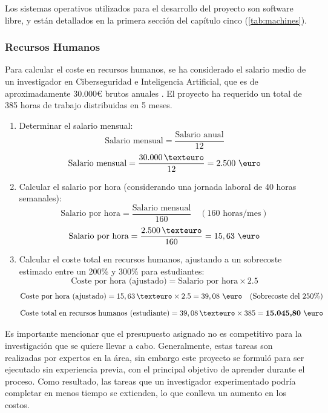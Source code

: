 Los sistemas operativos utilizados para el desarrollo del proyecto son software libre, y están detallados en la primera sección del capítulo cinco (\ref{tab:machines}).

\subsubsection*{Recursos Humanos}

Para calcular el coste en recursos humanos, se ha considerado el salario medio de un investigador en Ciberseguridad e Inteligencia Artificial, que es de aproximadamente 30.000€ brutos anuales \cite{ufv2023cybersecurity}. El proyecto ha requerido un total de 385 horas de trabajo distribuidas en 5 meses.

\begin{enumerate}
    \item Determinar el salario mensual:
    \[
    \text{Salario mensual} = \frac{\text{Salario anual}}{12}
    \]
    \[
    \text{Salario mensual} = \frac{30.000\,€}{12} = 2.500 \ \text{\euro}
    \]

    \item Calcular el salario por hora (considerando una jornada laboral de 40 horas semanales):
    \[
    \text{Salario por hora} = \frac{\text{Salario mensual}}{160} \quad (\text{160 horas/mes})
    \]
    \[
    \text{Salario por hora} = \frac{2.500\,€}{160} = 15,63 \ \text{\euro}
    \]

    \item Calcular el coste total en recursos humanos, ajustando a un sobrecoste estimado entre un 200\% y 300\% para estudiantes:
    \[
    \text{Coste por hora (ajustado)} = \text{Salario por hora} \times 2.5
    \]
    \[
    \text{Coste por hora (ajustado)} = 15,63\,€ \times 2.5 = 39,08 \ \text{\euro} \quad (\text{Sobrecoste del 250\%})
    \]
    \[
    \text{Coste total en recursos humanos (estudiante)} = 39,08\,€ \times 385 = \textbf{15.045,80} \ \text{\euro}
    \]
\end{enumerate}

Es importante mencionar que el presupuesto asignado no es competitivo para la investigación que se quiere llevar a cabo. Generalmente, estas tareas son realizadas por expertos en la área, sin embargo este proyecto se formuló para ser ejecutado sin experiencia previa, con el principal objetivo de aprender durante el proceso. Como resultado, las tareas que un investigador experimentado podría completar en menos tiempo se extienden, lo que conlleva un aumento en los costos. \\

